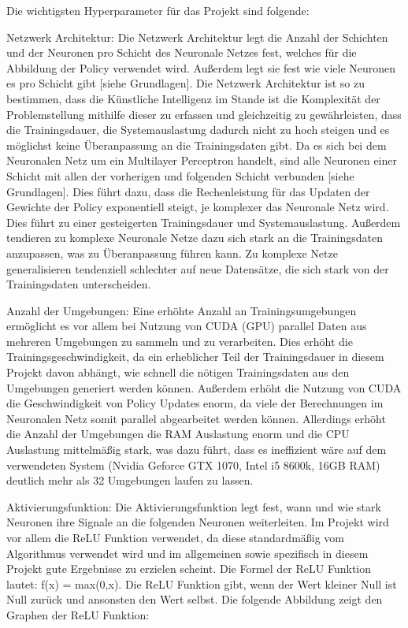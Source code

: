 Die wichtigsten Hyperparameter für das Projekt sind folgende:

Netzwerk Architektur: Die Netzwerk Architektur legt die Anzahl der Schichten und der Neuronen pro Schicht des Neuronale Netzes fest, welches für die Abbildung der Policy verwendet wird. Außerdem legt sie fest wie viele Neuronen es pro Schicht gibt [siehe Grundlagen]. Die Netzwerk Architektur ist so zu bestimmen, dass die Künstliche Intelligenz im Stande ist die Komplexität der Problemstellung mithilfe dieser zu erfassen und gleichzeitig zu gewährleisten, dass die Trainingsdauer, die Systemauslastung dadurch nicht zu hoch steigen und es möglichst keine Überanpassung an die Trainingsdaten gibt. Da es sich bei dem Neuronalen Netz um ein Multilayer Perceptron handelt, sind alle Neuronen einer Schicht mit allen der vorherigen und folgenden Schicht verbunden [siehe Grundlagen]. Dies führt dazu, dass die Rechenleistung für das Updaten der Gewichte der Policy exponentiell steigt, je komplexer das Neuronale Netz wird. Dies führt zu einer gesteigerten Trainingsdauer und Systemauslastung. Außerdem tendieren zu komplexe Neuronale Netze dazu sich stark an die Trainingsdaten anzupassen, was zu Überanpassung führen kann. Zu komplexe Netze generalisieren tendenziell schlechter auf neue Datensätze, die sich stark von der Trainingsdaten unterscheiden.

Anzahl der Umgebungen: Eine erhöhte Anzahl an Trainingsumgebungen ermöglicht es vor allem bei Nutzung von CUDA (GPU) parallel Daten aus mehreren Umgebungen zu sammeln und zu verarbeiten. Dies erhöht die Trainingsgeschwindigkeit, da ein erheblicher Teil der Trainingsdauer in diesem Projekt davon abhängt, wie schnell die nötigen Trainingsdaten aus den Umgebungen generiert werden können. Außerdem erhöht die Nutzung von CUDA die Geschwindigkeit von Policy Updates enorm, da viele der Berechnungen im Neuronalen Netz somit parallel abgearbeitet werden können. Allerdings erhöht die Anzahl der Umgebungen die RAM Auslastung enorm und die CPU Auslastung mittelmäßig stark, was dazu führt, dass es ineffizient wäre auf dem verwendeten System (Nvidia Geforce GTX 1070, Intel i5 8600k, 16GB RAM) deutlich mehr als 32 Umgebungen laufen zu lassen.

Aktivierungsfunktion: Die Aktivierungsfunktion legt fest, wann und wie stark Neuronen ihre Signale an die folgenden Neuronen weiterleiten. Im Projekt wird vor allem die ReLU Funktion verwendet, da diese standardmäßig vom Algorithmus verwendet wird und im allgemeinen sowie spezifisch in diesem Projekt gute Ergebnisse zu erzielen scheint. Die Formel der ReLU Funktion lautet: f(x) = max(0,x). Die ReLU Funktion gibt, wenn der Wert kleiner Null ist Null zurück und ansonsten den Wert selbst. Die folgende Abbildung zeigt den Graphen der ReLU Funktion:\\

